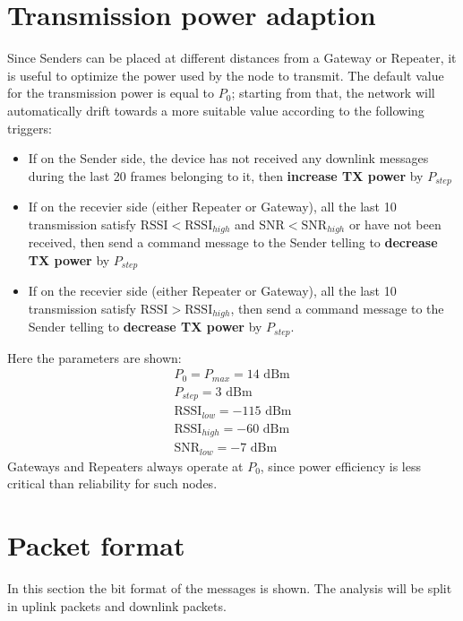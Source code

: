 \section{Transmission power adaption}
\label{sec: transmission power adaption}
Since Senders can be placed at different distances from a Gateway or Repeater, it is useful to optimize the power
used by the node to transmit. The default value for the transmission power is equal to $P_{0}$; starting from that, the
network will automatically drift towards a more suitable value according to the
following triggers:
\begin{itemize}
    \item If on the Sender side, the device has not received any downlink messages during
        the last 20 frames belonging to it, then \textbf{increase TX power} by $P_{step}$
    \item If on the recevier side (either Repeater or Gateway), all the last 10 transmission
        satisfy $\text{RSSI} < \text{RSSI}_{high}$ and $\text{SNR} < \text{SNR}_{high}$ or have not been received, then
        send a command message to the Sender telling to \textbf{decrease TX power} by $P_{step}$
    \item If on the recevier side (either Repeater or Gateway), all the last 10 transmission
        satisfy $\text{RSSI} > \text{RSSI}_{high}$, then send a command message to the Sender telling to
        \textbf{decrease TX power} by $P_{step}$.
\end{itemize}
Here the parameters are shown:
\begin{equation}
    \begin{array}{l}
        P_{0} = P_{max} = 14\text{ dBm} \\ P_{step} = 3\text{ dBm} \\ \text{RSSI}_{low} = -115\text{ dBm} \\ \text{RSSI}
        _{high} = -60\text{ dBm} \\ \text{SNR}_{low} = -7\text{ dBm}
    \end{array}
\end{equation}
Gateways and Repeaters always operate at $P_{0}$, since power efficiency is less critical than reliability for such nodes.


\section{Packet format}
In this section the bit format of the messages is shown. The analysis will be split in uplink packets and downlink
packets.

